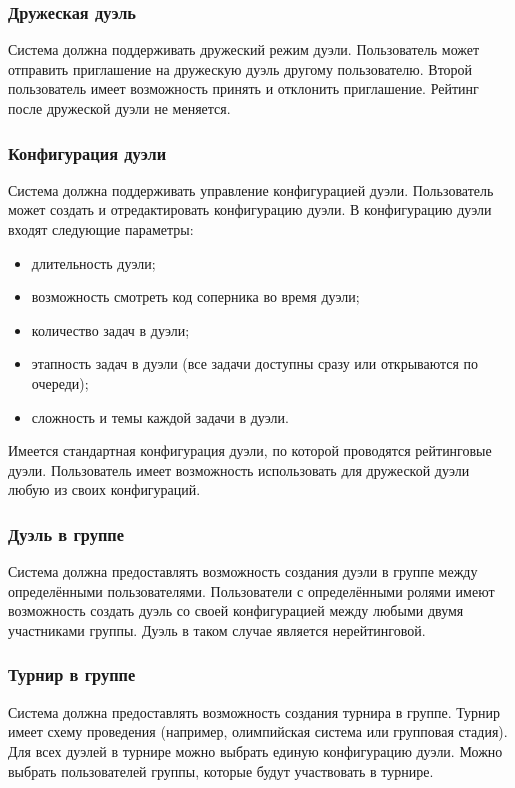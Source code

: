 \subsubsection*{Дружеская дуэль}
Система должна поддерживать дружеский режим дуэли.
Пользователь может отправить приглашение на дружескую дуэль другому пользователю.
Второй пользователь имеет возможность принять и отклонить приглашение.
Рейтинг после дружеской дуэли не меняется.

\subsubsection*{Конфигурация дуэли}
Система должна поддерживать управление конфигурацией дуэли.
Пользователь может создать и отредактировать конфигурацию дуэли.
В конфигурацию дуэли входят следующие параметры:
\begin{itemize}
\item длительность дуэли;
\item возможность смотреть код соперника во время дуэли;
\item количество задач в дуэли;
\item этапность задач в дуэли (все задачи доступны сразу или открываются по очереди);
\item сложность и темы каждой задачи в дуэли.
\end{itemize}
Имеется стандартная конфигурация дуэли, по которой проводятся рейтинговые дуэли.
Пользователь имеет возможность использовать для дружеской дуэли любую из своих конфигураций.

\subsubsection*{Дуэль в группе}
Система должна предоставлять возможность создания дуэли в группе между определёнными пользователями.
Пользователи с определёнными ролями имеют возможность создать дуэль со своей конфигурацией между любыми двумя участниками группы.
Дуэль в таком случае является нерейтинговой.

\subsubsection*{Турнир в группе}
Система должна предоставлять возможность создания турнира в группе.
Турнир имеет схему проведения (например, олимпийская система или групповая стадия).
Для всех дуэлей в турнире можно выбрать единую конфигурацию дуэли.
Можно выбрать пользователей группы, которые будут участвовать в турнире.

